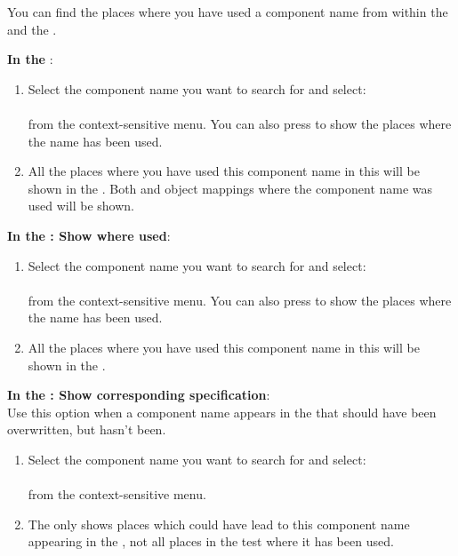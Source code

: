 You can find the places where you have used a component name from within the \gdomeditor{} and the \gdcompnamebrowser{}. 

\textbf{In the \gdcompnamebrowser{}}:
\begin{enumerate}
\item Select the component name you want to search for and select:\\
\\
from the context-sensitive menu. 
You can also press  to show the places where the name has been used.
\item All the places where you have used this component name in this \gdproject{} will be shown in the \gdsearchresultview{} . Both \gdcases{} and object mappings where the component name was used will be shown. 
\end{enumerate}

\textbf{In the \gdomeditor{}: Show where used}:
\begin{enumerate}
\item Select the component name you want to search for and select:\\
\\
from the context-sensitive menu. 
You can also press  to show the places where the name has been used.
\item All the places where you have used this component name in this \gdproject{} will be shown in the \gdsearchresultview{} . 
\end{enumerate}

\textbf{In the \gdomeditor{}: Show corresponding specification}:\\
Use this option when a component name appears in the \gdomeditor{} that should have been overwritten, but hasn't been.
\begin{enumerate}
\item Select the component name you want to search for and select:\\
\\
from the context-sensitive menu. 
\item The \gdsearchresultview{} only shows places which could have lead to this component name appearing in the \gdomeditor{}, not all places in the test where it has been used.
\end{enumerate}

